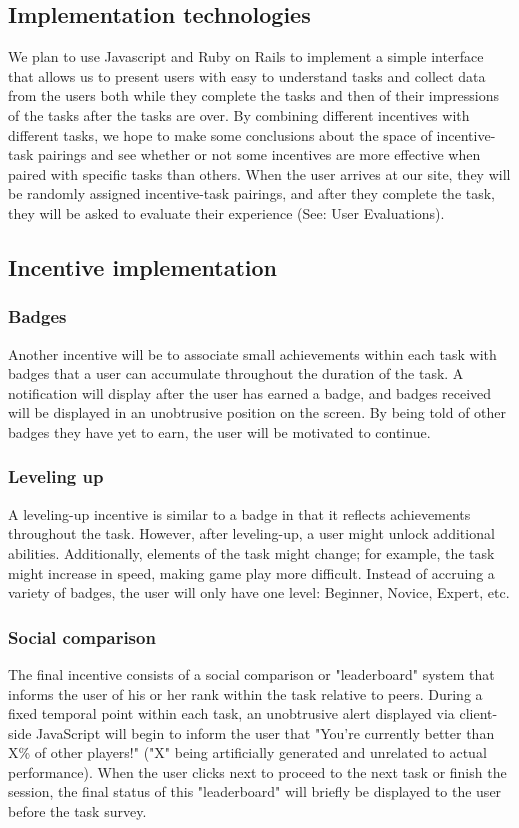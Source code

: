  \subsection{Implementation technologies}
We plan to use Javascript and Ruby on Rails to implement a simple interface that allows us to present users with easy to understand tasks and collect data from the users both while they complete the tasks and then of their impressions of the tasks after the tasks are over. By combining different incentives with different tasks, we hope to make some conclusions about the space of incentive-task pairings and see whether or not some incentives are more effective when paired with specific tasks than others. When the user arrives at our site, they will be randomly assigned incentive-task pairings, and after they complete the task, they will be asked to evaluate their experience (See: User Evaluations).
 
 \subsection{Incentive implementation}

\subsubsection{Badges} 
Another incentive will be to associate small achievements within each task with badges that a user can accumulate throughout the duration of the task. A notification will display after the user has earned a badge, and badges received will be displayed in an unobtrusive position on the screen. By being told of other badges they have yet to earn, the user will be motivated to continue.
\subsubsection{Leveling up} 
A leveling-up incentive is similar to a badge in that it reflects achievements throughout the task. However, after leveling-up, a user might unlock additional abilities. Additionally, elements of the task might change; for example, the task might increase in speed, making game play more difficult. Instead of accruing a variety of badges, the user will only have one level: Beginner, Novice, Expert, etc. 
\subsubsection{Social comparison}
The final incentive consists of a social comparison or "leaderboard" system that informs the user of his or her rank within the task relative to peers. During a fixed temporal point within each task, an unobtrusive alert displayed via client-side JavaScript will begin to inform the user that "You're currently better than X\% of other players!" ("X" being artificially generated and unrelated to actual performance). When the user clicks next to proceed to the next task or finish the session, the final status of this "leaderboard" will briefly be displayed to the user before the task survey.
 
